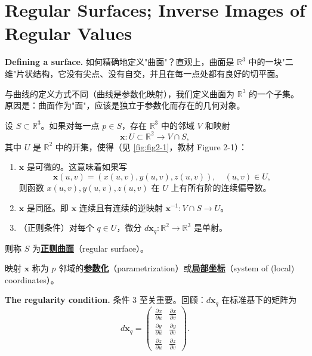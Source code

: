 \section{Regular Surfaces; Inverse Images of Regular Values}\label{sec:regular-surfaces}

\textbf{Defining a surface.} 如何精确地定义"曲面"？直观上，曲面是 $\mathbb{R}^3$ 中的一块"二维"片状结构，它没有尖点、没有自交，并且在每一点处都有良好的切平面。

与曲线的定义方式不同（曲线是参数化映射），我们定义曲面为 $\mathbb{R}^3$ 的一个子集。原因是：曲面作为"面"，应该是独立于参数化而存在的几何对象。

\begin{Definition}[正则曲面]\label{def:regular-surface}
设 $S \subset \mathbb{R}^3$。如果对每一点 $p \in S$，存在 $\mathbb{R}^3$ 中的邻域 $V$ 和映射
\[
\mathbf{x}: U \subset \mathbb{R}^2 \to V \cap S,
\]
其中 $U$ 是 $\mathbb{R}^2$ 中的开集，使得（见 \cref{fig:fig2-1}，教材 Figure 2-1）：
\begin{enumerate}
\item $\mathbf{x}$ 是可微的。这意味着如果写
\[
\mathbf{x}(u,v) = (x(u,v), y(u,v), z(u,v)),\quad (u,v) \in U,
\]
则函数 $x(u,v), y(u,v), z(u,v)$ 在 $U$ 上有所有阶的连续偏导数。

\item $\mathbf{x}$ 是同胚。即 $\mathbf{x}$ 连续且有连续的逆映射 $\mathbf{x}^{-1}: V \cap S \to U$。

\item（正则条件）对每个 $q \in U$，微分 $d\mathbf{x}_q: \mathbb{R}^2 \to \mathbb{R}^3$ 是单射。
\end{enumerate}
则称 $S$ 为\textbf{\underline{正则曲面}}（regular surface）。
\end{Definition}

映射 $\mathbf{x}$ 称为 $p$ 邻域的\textbf{\underline{参数化}}（parametrization）或\textbf{\underline{局部坐标}}（system of (local) coordinates）。

\textbf{The regularity condition.} 条件 3 至关重要。回顾：$d\mathbf{x}_q$ 在标准基下的矩阵为
\[
d\mathbf{x}_q = \begin{pmatrix}
\frac{\partial x}{\partial u} & \frac{\partial x}{\partial v} \\
\frac{\partial y}{\partial u} & \frac{\partial y}{\partial v} \\
\frac{\partial z}{\partial u} & \frac{\partial z}{\partial v}
\end{pmatrix}.
\]

